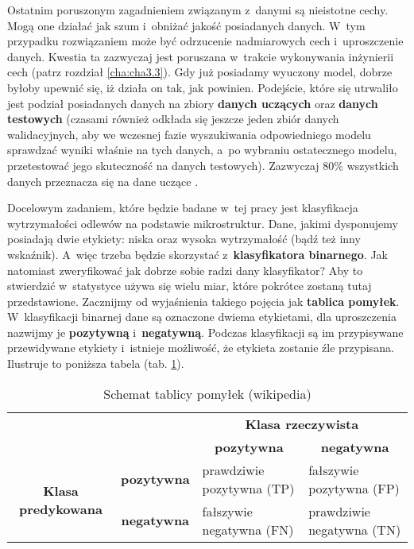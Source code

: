 Ostatnim poruszonym zagadnieniem  związanym z~danymi są nieistotne cechy. Mogą one działać jak szum i~obniżać jakość posiadanych danych. W~tym przypadku rozwiązaniem może być odrzucenie nadmiarowych cech i~uproszczenie danych. Kwestia ta zazwyczaj jest poruszana w~trakcie wykonywania inżynierii cech (patrz rozdział \ref{cha:cha3.3}).
Gdy już posiadamy wyuczony model, dobrze byłoby upewnić się, iż działa on tak, jak powinien. Podejście, które się utrwaliło jest podział posiadanych danych na zbiory \textbf{danych uczących} oraz \textbf{danych testowych} (czasami również odkłada się jeszcze jeden zbiór danych walidacyjnych, aby we wczesnej fazie wyszukiwania odpowiedniego modelu sprawdzać wyniki właśnie na tych danych, a~po wybraniu ostatecznego modelu, przetestować jego skuteczność na danych testowych). Zazwyczaj 80\% wszystkich danych przeznacza się na dane uczące \cite{Sawka18}.

Docelowym zadaniem, które będzie badane w~tej pracy jest klasyfikacja wytrzymałości odlewów na podstawie mikrostruktur. Dane, jakimi dysponujemy posiadają dwie etykiety: niska oraz wysoka wytrzymałość (bądź też inny wskaźnik). A~więc trzeba będzie skorzystać z~\textbf{klasyfikatora binarnego}. Jak natomiast zweryfikować jak dobrze sobie radzi dany klasyfikator? Aby to stwierdzić w~statystyce używa się wielu miar, które pokrótce zostaną tutaj przedstawione. Zacznijmy od wyjaśnienia takiego pojęcia jak \textbf{tablica pomyłek}. W~klasyfikacji binarnej dane są oznaczone dwiema etykietami, dla uproszczenia nazwijmy je \textbf{pozytywną} i~\textbf{negatywną}. Podczas klasyfikacji są im przypisywane przewidywane etykiety i~istnieje możliwość, że etykieta zostanie źle przypisana. Ilustruje to poniższa tabela (tab. \ref{tab:tab2}).

\begin{table}[h]
	\centering
	
	\begin{threeparttable}
		\caption{Schemat tablicy pomyłek (wikipedia)}
		\label{tab:tab2}
				
		\begin{tabularx}{1\textwidth}{ |c|c|X|X| }\hline
		  \multicolumn{2}{|c|}{\multirow{2}{*}{}} & \multicolumn{2}{|c|}{\textbf{Klasa rzeczywista}}\\ \cline{3-4}
      
		  \multicolumn{2}{|c|}{} & \multicolumn{1}{|c|}{\textbf{pozytywna}} & \multicolumn{1}{c|}{\textbf{negatywna}}\\ \hline
       
		  \multirow{2}{*}{\textbf{Klasa predykowana}} & \textbf{pozytywna} & prawdziwie pozytywna (TP) & fałszywie pozytywna (FP)\\ \cline{2-4}
      
		   & \textbf{negatywna} & fałszywie negatywna (FN) & prawdziwie negatywna (TN)\\ \hline
		\end{tabularx}

	\end{threeparttable}
\end{table}

